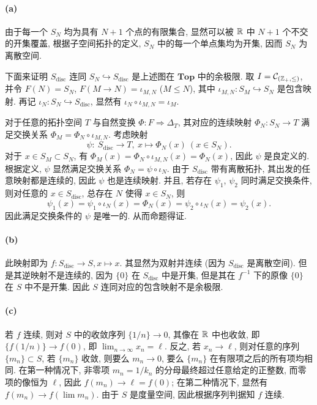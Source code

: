 \documentclass{article}
\begin{document}
\begin{solution}
	\paragraph{(a)} 由于每一个 $S_N$ 均为具有 $N+1$ 个点的有限集合, 显然可以被 $\mathbb{R}$ 中 $N+1$ 个不交的开集覆盖, 根据子空间拓扑的定义, $S_N$ 中的每一个单点集均为开集, 因而 $S_N$ 为离散空间.

	下面来证明 $S_{\mathrm{disc}}$ 连同 $S_N \hookrightarrow S_{\mathrm{disc}}$ 是上述图在 $\mathbf{Top}$ 中的余极限. 取 $I = \mathcal C_{(\mathbb{Z}_+,\le)}$, 并令 $F(N) = S_N$, $F(M\to N) = \iota_{M,N}$ ($M\le N$), 其中 $\iota_{M,N}: S_M \hookrightarrow S_N$ 是包含映射. 再记 $\iota_N: S_N \hookrightarrow S_{\mathrm{disc}}$, 显然有 $\iota_N\circ\iota_{M,N} = \iota_M$.

	对于任意的拓扑空间 $T$ 与自然变换 $\Phi: F \Longrightarrow \Delta_T$, 其对应的连续映射 $\Phi_N: S_N \to T$ 满足交换关系 $\Phi_M = \Phi_N \circ \iota_{M, N}$. 考虑映射
	\[ \psi : \ S_{\mathrm{disc}} \to T, \ x \mapsto \Phi_N(x)\ (x \in S_N). \]
	对于 $x \in S_M \subset S_N$, 有 $\Phi_M (x) = \Phi_N \circ \iota_{M, N}(x) = \Phi_N (x)$, 因此 $\psi$ 是良定义的. 根据定义, $\psi$ 显然满足交换关系 $\Phi_N = \psi \circ \iota_N$. 由于 $S_{\mathrm{disc}}$ 带有离散拓扑, 其出发的任意映射都是连续的, 因此 $\psi$ 也是连续映射. 并且, 若存在 $\psi_1$, $\psi_2$ 同时满足交换条件, 则对任意的 $x \in S_{\mathrm{disc}}$, 总存在 $N$ 使得 $x \in S_N$, 则
	\[ \psi_1(x) = \psi_1 \circ \iota_N(x) = \Phi_N(x) = \psi_2 \circ \iota_N(x) = \psi_2(x). \]
	因此满足交换条件的 $\psi$ 是唯一的. 从而命题得证.

	\paragraph{(b)} 此映射即为 $f: S_{\mathrm{disc}} \to S, x \mapsto x$. 其显然为双射并连续 (因为 $S_{\mathrm{disc}}$ 是离散空间). 但是其逆映射不是连续的, 因为 $\{0\}$ 在 $S_{\mathrm{disc}}$ 中是开集, 但是其在 $f^{-1}$ 下的原像 $\{0\}$ 在 $S$ 中不是开集. 因此 $S$ 连同对应的包含映射不是余极限.

	\paragraph{(c)} 若 $f$ 连续, 则对 $S$ 中的收敛序列 $\{1/n\} \to 0$, 其像在 $\mathbb{R}$ 中也收敛, 即 $\{f(1/n)\} \to f(0)$, 即 $\lim_{n \to \infty} x_n = \ell$. 反之, 若 $x_n \to \ell$, 则对任意的序列 $\{m_n\} \subset S$, 若 $\{m_n\}$ 收敛, 则要么 $m_n \to 0$, 要么 $\{m_n\}$ 在有限项之后的所有项均相同. 在第一种情况下, 非零项 $m_n = 1/k_n$ 的分母最终超过任意给定的正整数, 而零项的像恒为 $\ell$, 因此 $f(m_n)\to\ell=f(0)$; 在第二种情况下, 显然有 $f(m_n)\to f(\lim m_n)$. 由于 $S$ 是度量空间, 因此根据序列判据知 $f$ 连续.
\end{solution}
\end{document}
